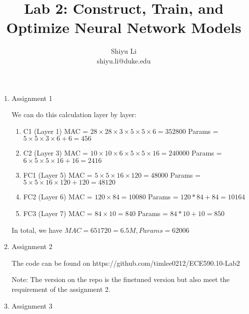 \documentclass[11pt]{article}
\begin{document}
\author{Shiyu Li \\ shiyu.li@duke.edu}
\title{Lab 2: Construct, Train, and Optimize Neural Network Models}
\maketitle

\medskip

\begin{enumerate}

\item
Assignment 1

We can do this calculation layer by layer:

\begin{enumerate}
    \item C1 (Layer 1)
        MAC = $28\times 28 \times 3 \times 5 \times 5 \times 6 = 352800$ 
        Params = $5\times 5\times 3 \times 6 + 6  = 456$
    \item C2 (Layer 3)
        MAC = $10\times 10 \times 6 \times 5 \times 5 \times 16 = 240000$
        Params = $6\times 5 \times 5 \times 16 + 16 = 2416$
    \item FC1 (Layer 5)
        MAC = $5\times 5\times 16 \times 120 = 48000$
        Params = $5\times 5\times 16 \times 120 + 120 = 48120$
        
    \item FC2 (Layer 6)
        MAC = $120 \times 84 = 10080$
        Params = $120*84 + 84 = 10164$
        
    \item FC3 (Layer 7)
        MAC = $84 \times 10 = 840$
        Params = $84 * 10 + 10 = 850$
        
\end{enumerate}

In total, we have $MAC = 651720 = 6.5M, Params= 62006$

\item
Assignment 2

The code can be found on https://github.com/timlee0212/ECE590.10-Lab2

Note: The version on the repo is the finetuned version but also meet the requirement of the assignment 2.

\item
Assignment 3

\end{enumerate}
\end{document}
